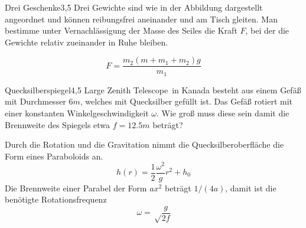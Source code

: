 



\begin{problem}{Drei Geschenke}{3,5}
Drei Gewichte sind wie in der Abbildung dargestellt angeordnet und können reibungsfrei aneinander und am Tisch gleiten. Man bestimme unter Vernachlässigung der Masse des Seiles die Kraft $F$, bei der die Gewichte relativ zueinander in Ruhe bleiben.

\begin{solution}
\[
F = \frac{m_2 (m+m_1+m_2) g}{m_1}
\]
\end{solution}
\end{problem}

\begin{problem}{Quecksilberspiegel}{4,5}
\glqq Large Zenith Telescope\grqq\ in Kanada besteht aus einem Gefäß mit Durchmesser $6 \unit{m}$, welches mit Quecksilber gefüllt ist. Das Gefäß rotiert mit einer konstanten Winkelgeschwindigkeit $\omega$. Wie groß muss diese sein damit die Brennweite des Spiegels etwa $f=12.5 \unit{m}$ beträgt?

\begin{solution}
Durch die Rotation und die Gravitation nimmt die Quecksilberoberfläche die Form eines Paraboloids an.
\[
h(r) = \frac12 \frac{\omega^2}{g} r^2 + h_0
\]
Die Brennweite einer Parabel der Form $ax^2$ beträgt $1/(4a)$, damit ist die benötigte Rotationsfrequenz
\[
\omega = \sqrt\frac{g}{2 f}
\]
\end{solution}

\end{problem}

